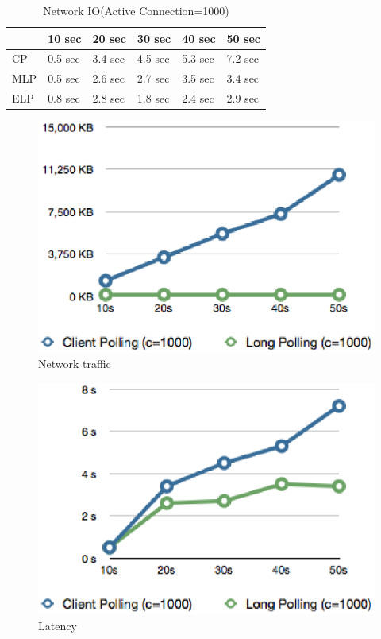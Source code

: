 \begin{table}
\centering \caption{\label{tb:traffic} Network IO(Active Connection=1000)}
\begin{tabular}{|l|l|l|l|l|l|}
    \hline  & 10 sec & 20 sec & 30 sec & 40 sec & 50 sec \\
    \hline CP & 0.5 sec & 3.4 sec & 4.5 sec & 5.3 sec & 7.2 sec \\
    \hline MLP & 0.5 sec & 2.6 sec & 2.7 sec & 3.5 sec & 3.4 sec \\
    \hline ELP & 0.8 sec & 2.8 sec & 1.8 sec & 2.4 sec & 2.9 sec \\
    \hline
\end{tabular}
\end{table}

\begin{figure}[htb!]
\centering%
    \includegraphics[scale=0.60]{figures/io.eps}
    \caption{Network traffic}
    \label{fig:traffic_io}
\end{figure}

\begin{figure}[htb!]
\centering%
    \includegraphics[scale=0.60]{figures/latency.eps}
    \caption{Latency}
    \label{fig:traffic_latency}
\end{figure}

